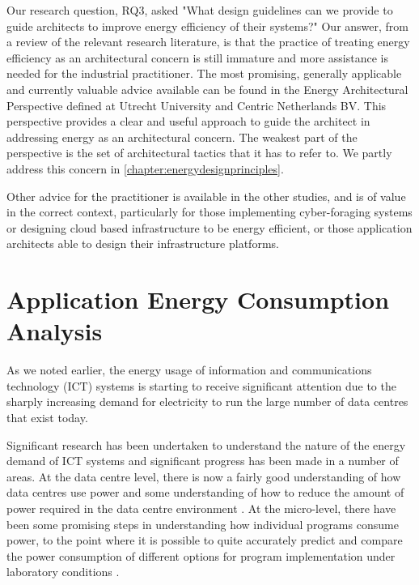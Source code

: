 Our research question, RQ3, asked "What design guidelines can we provide to guide architects to improve energy efficiency of their systems?"  Our answer, from a  review of the relevant research literature, is that the practice of treating energy efficiency as an architectural concern is still immature and more assistance is needed for the industrial practitioner.  The most promising, generally applicable and currently valuable advice available can be found in the Energy Architectural Perspective defined at Utrecht University and Centric Netherlands BV.  This perspective provides a clear and useful approach to guide the architect in addressing energy as an architectural concern.  The weakest part of the perspective is the set of architectural tactics that it has to refer to.  We partly address this concern in \cref{chapter:energydesignprinciples}.

Other advice for the practitioner is available in the other studies, and is of value in the correct context, particularly for those implementing cyber-foraging systems or designing cloud based infrastructure to be energy efficient, or those application architects able to design their infrastructure platforms.

\section{Application Energy Consumption Analysis} \label{sec:litreviewenergy}

As we noted earlier, the energy usage of information and communications technology (ICT) systems is starting to receive significant attention due to the sharply increasing demand for electricity to run the large number of data centres that exist today.

Significant research has been undertaken to understand the nature of the energy demand of ICT systems and significant progress has been made in a number of areas.  At the data centre level, there is now a fairly good understanding of how data centres use power and some understanding of how to reduce the amount of power required in the data centre environment \cite{dc4cities2014_dcmetrics, dayarathna2016-dcenergy}.  At the micro-level, there have been some promising steps in understanding how individual programs consume power, to the point where it is possible to quite accurately predict and compare the power consumption of different options for program implementation under laboratory conditions \cite{bourdon2013-powerapi, noureddine2012-hotspots, islam2016-energysoftwarefeatures, acar2016-beyondcpu}.

